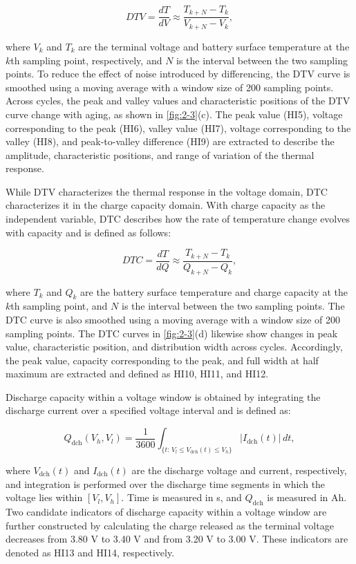 \begin{equation}
DTV=\frac{dT}{dV}\approx\frac{T_{k+N}-T_k}{V_{k+N}-V_k},
\end{equation}

where $V_k$ and $T_k$ are the terminal voltage and battery surface temperature at the $k$th sampling point, respectively, and $N$ is the interval between the two sampling points. To reduce the effect of noise introduced by differencing, the DTV curve is smoothed using a moving average with a window size of 200 sampling points. Across cycles, the peak and valley values and characteristic positions of the DTV curve change with aging, as shown in \cref{fig:2-3}(c). The peak value (HI5), voltage corresponding to the peak (HI6), valley value (HI7), voltage corresponding to the valley (HI8), and peak-to-valley difference (HI9) are extracted to describe the amplitude, characteristic positions, and range of variation of the thermal response\cite{ref64}.

While DTV characterizes the thermal response in the voltage domain, DTC characterizes it in the charge capacity domain. With charge capacity as the independent variable, DTC describes how the rate of temperature change evolves with capacity and is defined as follows\cite{ref64}:

\begin{equation}
DTC=\frac{dT}{dQ}\approx\frac{T_{k+N}-T_k}{Q_{k+N}-Q_k},
\end{equation}

where $T_k$ and $Q_k$ are the battery surface temperature and charge capacity at the $k$th sampling point, and $N$ is the interval between the two sampling points. The DTC curve is also smoothed using a moving average with a window size of 200 sampling points. The DTC curves in \cref{fig:2-3}(d) likewise show changes in peak value, characteristic position, and distribution width across cycles. Accordingly, the peak value, capacity corresponding to the peak, and full width at half maximum are extracted and defined as HI10, HI11, and HI12.

Discharge capacity within a voltage window is obtained by integrating the discharge current over a specified voltage interval and is defined as:

\begin{equation}
Q_{\mathrm{dch}}(V_h,V_l)=\frac{1}{3600}\int_{\{t:\,V_l\leq V_{\mathrm{dch}}(t)\leq V_h\}}\left|I_{\mathrm{dch}}(t)\right|\,dt,
\end{equation}

where $V_{\mathrm{dch}}(t)$ and $I_{\mathrm{dch}}(t)$ are the discharge voltage and current, respectively, and integration is performed over the discharge time segments in which the voltage lies within $[V_l,V_h]$. Time is measured in s, and $Q_{\mathrm{dch}}$ is measured in Ah. Two candidate indicators of discharge capacity within a voltage window are further constructed by calculating the charge released as the terminal voltage decreases from 3.80 V to 3.40 V and from 3.20 V to 3.00 V. These indicators are denoted as HI13 and HI14, respectively\cite{ref31,ref52}.

